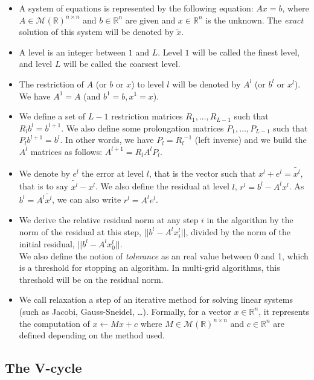 \documentclass[10pt,conference]{IEEEtran}
\begin{document}
\begin{itemize}
 \item A system of equations is represented by the following equation: $Ax=b$, where $A \in \mathcal{M}(\mathbb{R})^{n\times n}$ and $b \in \mathcal{\mathbb{R}}^n$ are given and
 $x \in \mathbb{R}^n$ is the unknown. The \emph{exact} solution of this system will be denoted by $\widetilde{x}$.
 \item A level is an integer between $1$ and $L$. Level $1$ will be called the finest level, and level $L$ will be called the coarsest level.
 \item The restriction of $A$ (or $b$ or $x$) to level $l$ will be denoted by $A^l$ (or $b^l$ or $x^l$). We have $A^1 = A$ (and $b^1=b,x^1=x$).
 \item We define a set of $L-1$ restriction matrices $R_1,\dots,R_{L-1}$ such that $R_l b^l = b^{l+1}$. We also define some prolongation matrices $P_1,\dots,P_{L-1}$ such that $P_{l}b^{l+1} = b^l$.
 In other words, we have $P_l = {R_l}^{-1}$ (left inverse) and we build the $A^l$ matrices as follows: $A^{l+1} = R_l A^l P_l$.
 \item We denote by $e^l$ the error at level $l$, that is the vector such that $x^l + e^l = \widetilde{x^l}$, that is to say $\widetilde{x^l}-x^l$.
 We also define the residual at level $l$, $r^l = b^l - A^lx^l$. As $b^l = A^l\widetilde{x^l}$, we can also write $r^l = A^le^l$.
 \item We derive the relative residual norm at any step $i$ in the algorithm
 by the norm of the residual at this step, $||b^l - A^lx^l_i||$, divided by the norm of the initial residual, $|| b^l - A^lx^l_0||$.\\ We also define the notion of \emph{tolerance}
 as an real value between 0 and 1, which is a threshold for stopping an algorithm. In multi-grid algorithms, this threshold will be on the residual norm.
 \item We call relaxation a step of an iterative method for solving linear systems (such as Jacobi, Gauss-Sneidel, \dots). Formally, for a vector $x \in \mathbb{R}^n$, it represents the computation of
 $x \leftarrow Mx + c$ where $M \in \mathcal{M}(\mathbb{R})^{n\times n}$ and $c \in \mathcal{\mathbb{R}}^n$ are defined depending on the method used.
\end{itemize}

\subsection{The V-cycle}
\end{document}
